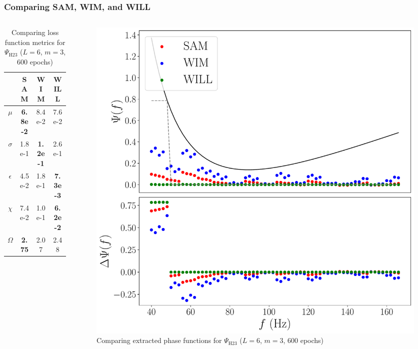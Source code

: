 \documentclass{beamer}
\begin{document}
\begin{frame}
\frametitle{Comparing SAM, WIM, and WILL}
\begin{columns}
\begin{column}{0.5\textwidth}
\begin{table}
\begin{tabular}{c || c| c| c }
& SAM & WIM & WILL \\ \hline \hline 
$\mu$ &  \textbf{6.8e-2} & 8.4e-2 & 7.6e-2 \\
$\sigma$ &  1.8e-1 & \textbf{1.2e-1} & 2.6e-1 \\
$\epsilon$  &  4.5e-2 & 1.8e-1 & \textbf{7.3e-3 } \\
$\chi$ &  7.4e-2 & 1.0e-1 & \textbf{6.2e-2} \\ \hline 
$\Omega$ &  \textbf{2.75} & 2.07 & 2.48
\end{tabular}
\caption{Comparing loss function metrics for $\Psi_\text{H23}$ ($L=6$, $m=3$, 600 epochs)}
\end{table}
\end{column}
\begin{column}{0.5\textwidth}
\begin{figure}
\centering 
\includegraphics[width=\textwidth]{im/SAM_WIM_WILL_H_new}
\caption{Comparing extracted phase functions for $\Psi_\text{H23}$ ($L=6$, $m=3$, 600 epochs)}
\end{figure}
\end{column}
\end{columns}
\end{frame}
\end{document}
